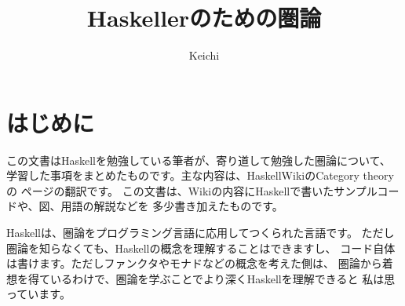 

\title{Haskellerのための圏論}
\author{Keichi}
\maketitle

\tableofcontents

\newpage
\section{はじめに}
この文書はHaskellを勉強している筆者が、寄り道して勉強した圏論について、
学習した事項をまとめたものです。主な内容は、HaskellWikiのCategory theoryの
ページ\cite{wiki}の翻訳です。
この文書は、Wikiの内容にHaskellで書いたサンプルコードや、図、用語の解説などを
多少書き加えたものです。

Haskellは、圏論をプログラミング言語に応用してつくられた言語です。
ただし圏論を知らなくても、Haskellの概念を理解することはできますし、
コード自体は書けます。ただしファンクタやモナドなどの概念を考えた側は、
圏論から着想を得ているわけで、圏論を学ぶことでより深くHaskellを理解できると
私は思っています。

